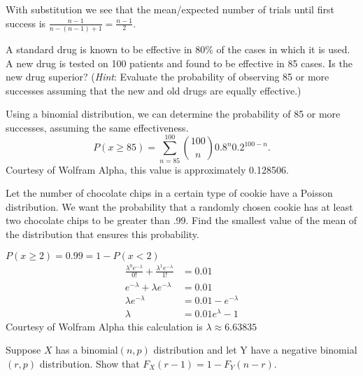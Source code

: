 \documentclass[12pt,letterpaper]{exam}
\begin{document}
\begin{questions}
\begin{solution}
\begin{parts}
			With substitution we see that the mean/expected number of trials until first success is
			\(\frac{n-1}{n-(n-1)+1} = \frac{n-1}{2}\).
			
		\end{parts}
	\end{solution}
	
	\question 
	A standard drug is known to be effective in 80\% of the cases in which it is used. A new
	drug is tested on 100 patients and found to be effective in 85 cases. Is the new drug
	superior? (\textit{Hint}: Evaluate the probability of observing 85 or more successes assuming
	that the new and old drugs are equally effective.)
	
	\begin{solution}
		Using a binomial distribution, we can determine the probability of 85 or more successes, assuming the same effectiveness.
		\[
			P(x \geq 85) = \sum_{n=85}^{100} \binom{100}{n} 0.8^{n} 0.2^{100-n}.
		\]
		Courtesy of Wolfram Alpha, this value is approximately 0.128506.
	\end{solution}
	
	\setcounter{question}{6}
	\question 
	Let the number of chocolate chips in a certain type of cookie have a Poisson distribution. We want the 
	probability that a randomly chosen cookie has at least two chocolate chips to be greater than .99. 
	Find the smallest value of the mean of the distribution that ensures this probability.
	
	\begin{solution}
		\(P(x\geq2) = 0.99 = 1 - P(x<2)\)
		\begin{align*}
			\frac{\lambda^0e^{-\lambda}}{0!} + \frac{\lambda^1e^{-\lambda}}{1!} &= 0.01 \\
			e^{-\lambda} + \lambda e^{-\lambda} &= 0.01 \\
			\lambda e^{-\lambda} &= 0.01 - e^{-\lambda} \\
			\lambda &= 0.01e^{\lambda} - 1
		\end{align*}
		Courtesy of Wolfram Alpha this calculation is \(\lambda \approx 6.63835\)
	\end{solution}
	
	\setcounter{question}{11}
	\question 
	Suppose \(X\) has a binomial\((n, p)\) distribution and let Y have a negative binomial\((r, p)\)
	distribution. Show that \(F_X(r-1) = 1-F_Y(n-r)\).
	

\end{questions}
\end{document}
